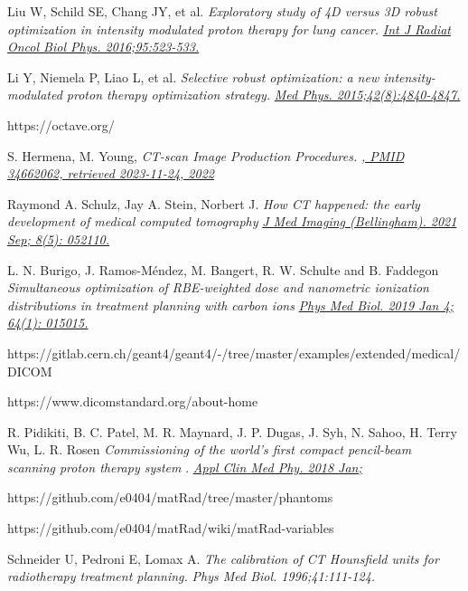 \documentclass[a4paper]{article}
\begin{document}
\begin{thebibliography}{}
Liu W, Schild SE, Chang JY, et al.
\emph{Exploratory study of 4D versus 3D robust optimization in intensity modulated proton therapy for lung cancer.}
\href{https://www.sciencedirect.com/science/article/abs/pii/S0360301615266849}{\emph{Int J Radiat Oncol Biol Phys. 2016;95:523-533.}}

Li Y, Niemela P, Liao L, et al.
\emph{Selective robust optimization: a new intensity-modulated proton therapy optimization strategy.}
\href{https://pure.johnshopkins.edu/en/publications/selective-robust-optimization-a-new-intensity-modulated-proton-th}
{\emph{Med Phys. 2015;42(8):4840-4847.}}

https://octave.org/

S. Hermena, M. Young,
\emph{CT-scan Image Production Procedures.}
\href{https://pubmed.ncbi.nlm.nih.gov/34662062/}{\emph{, PMID 34662062, retrieved 2023-11-24, 2022}}

Raymond A. Schulz, Jay A. Stein, Norbert J.
\emph{How CT happened: the early development of medical computed tomography}
\href{https://www.ncbi.nlm.nih.gov/pmc/articles/PMC8555965/}{\emph{J Med Imaging (Bellingham). 2021 Sep; 8(5): 052110.}}

L. N. Burigo, J. Ramos-Méndez, M. Bangert, R. W. Schulte and B. Faddegon
\emph{Simultaneous optimization of RBE-weighted dose and nanometric ionization distributions in treatment planning with carbon ions}
\href{https://www.ncbi.nlm.nih.gov/pmc/articles/PMC7164666/}{\emph{Phys Med Biol. 2019 Jan 4; 64(1): 015015. }}

https://gitlab.cern.ch/geant4/geant4/-/tree/master/examples/extended/medical/DICOM

https://www.dicomstandard.org/about-home

R. Pidikiti, B. C. Patel, M. R. Maynard, J. P. Dugas, J. Syh, N. Sahoo, H. Terry Wu, L. R. Rosen
\emph{Commissioning of the world's first compact pencil-beam scanning proton therapy system }.
\href{https://pubmed.ncbi.nlm.nih.gov/29152838/}
{\emph{Appl Clin Med Phy. 2018 Jan; }}

https://github.com/e0404/matRad/tree/master/phantoms

https://github.com/e0404/matRad/wiki/matRad-variables

Schneider U, Pedroni E, Lomax A.
\emph{The calibration of CT Hounsfield units for radiotherapy treatment planning.}
\emph{Phys Med Biol. 1996;41:111-124.}


\end{thebibliography}
\end{document}
